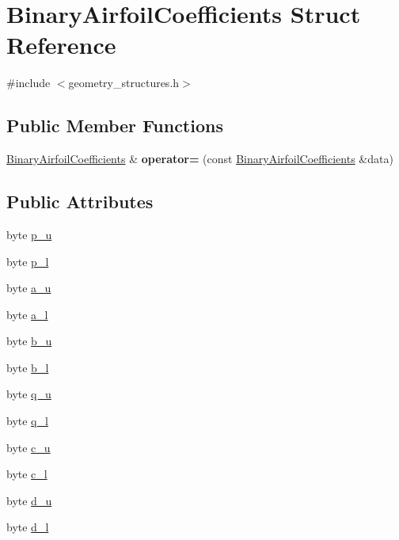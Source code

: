 \hypertarget{struct_binary_airfoil_coefficients}{}\section{Binary\+Airfoil\+Coefficients Struct Reference}
\label{struct_binary_airfoil_coefficients}


{\ttfamily \#include $<$geometry\+\_\+structures.\+h$>$}

\subsection*{Public Member Functions}
\begin{DoxyCompactItemize}
\item 
\mbox{\label{struct_binary_airfoil_coefficients_a1a7fcb4d52f90f94d0fca535897a5428}} 
\hyperlink{struct_binary_airfoil_coefficients}{Binary\+Airfoil\+Coefficients} \& {\bfseries operator=} (const \hyperlink{struct_binary_airfoil_coefficients}{Binary\+Airfoil\+Coefficients} \&data)
\end{DoxyCompactItemize}
\subsection*{Public Attributes}
\begin{DoxyCompactItemize}
\item 
byte \hyperlink{struct_binary_airfoil_coefficients_adc5da813d292a991f0e038348ff26ae1}{p\+\_\+u}
\item 
byte \hyperlink{struct_binary_airfoil_coefficients_a9474385e776695d50b75914ff62bd37a}{p\+\_\+l}
\item 
byte \hyperlink{struct_binary_airfoil_coefficients_a2fd01b5ce7c9bef55ba5e30bd19c062a}{a\+\_\+u}
\item 
byte \hyperlink{struct_binary_airfoil_coefficients_a49511b7e8398b06d8d880c7576ab5311}{a\+\_\+l}
\item 
byte \hyperlink{struct_binary_airfoil_coefficients_adadc9038b8731917b4dbcabd776b6627}{b\+\_\+u}
\item 
byte \hyperlink{struct_binary_airfoil_coefficients_a3d553603f76f7b5ddc6febc3a70db3f3}{b\+\_\+l}
\item 
byte \hyperlink{struct_binary_airfoil_coefficients_a6ed8c98c3817a396756b2a16a0d4791b}{q\+\_\+u}
\item 
byte \hyperlink{struct_binary_airfoil_coefficients_af015cf807e794441f030791862b22adb}{q\+\_\+l}
\item 
byte \hyperlink{struct_binary_airfoil_coefficients_a9de0fabddae28b4d649a256c19137eb4}{c\+\_\+u}
\item 
byte \hyperlink{struct_binary_airfoil_coefficients_a0c5c811277770502ff707312b5289601}{c\+\_\+l}
\item 
byte \hyperlink{struct_binary_airfoil_coefficients_a9640283446988bbdb012e94aaf2a41a3}{d\+\_\+u}
\item 
byte \hyperlink{struct_binary_airfoil_coefficients_a8b911d241a95f63e79813747ba2c25e6}{d\+\_\+l}
\end{DoxyCompactItemize}


